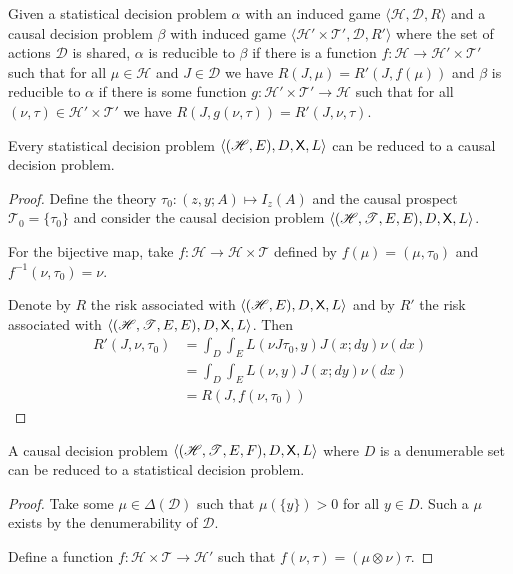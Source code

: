 \begin{definition}
Given a statistical decision problem $\alpha$ with an induced game $\langle \mathscr{H}, \mathscr{D}, R\rangle$ and a causal decision problem $\beta$ with induced game $\langle \mathscr{H}'\times \mathscr{T}', \mathscr{D}, R'\rangle$ where the set of actions $\mathscr{D}$ is shared, $\alpha$ is reducible to $\beta$ if there is a function $f:\mathscr{H}\to \mathscr{H}'\times\mathscr{T}'$ such that for all $\mu\in \mathscr{H}$ and $J\in \mathscr{D}$ we have $R(J,\mu)=R'(J,f(\mu))$ and $\beta$ is reducible to $\alpha$ if there is some function $g:\mathscr{H}'\times\mathscr{T}'\to \mathscr{H}$ such that for all $(\nu,\tau)\in \mathscr{H}'\times \mathscr{T}'$ we have $R(J,g(\nu,\tau))=R'(J,\nu,\tau)$.
\end{definition}

\begin{theorem}
Every statistical decision problem $\langle (\mathscr{H},E),D,\mathsf{X},L\rangle$ can be reduced to a causal decision problem.
\end{theorem}
\begin{proof}
Define the theory $\tau_0:(z,y;A)\mapsto I_z(A)$ and the causal prospect $\mathscr{T}_0=\{\tau_0\}$ and consider the causal decision problem $\langle (\mathscr{H},\mathscr{T},E,E),D,\mathsf{X},L\rangle$. 

For the bijective map, take $f:\mathscr{H}\to \mathscr{H}\times\mathscr{T}$ defined by $f(\mu)=(\mu,\tau_0)$ and $f^{-1}(\nu,\tau_0)=\nu$.

Denote by $R$ the risk associated with $\langle (\mathscr{H},E),D,\mathsf{X},L\rangle$ and by $R'$ the risk associated with $\langle (\mathscr{H},\mathscr{T},E,E),D,\mathsf{X},L\rangle$. Then
\begin{align}
    R'(J,\nu,\tau_0) &= \int_D\int_E L(\nu J\tau_0, y) J(x;dy) \nu(dx)\\
                   &= \int_D\int_E L(\nu,y) J(x;dy) \nu(dx)\\
                   &=R(J,f(\nu,\tau_0))
\end{align}
\end{proof}

\begin{theorem}
A causal decision problem $\langle (\mathscr{H},\mathscr{T},E,F),D,\mathsf{X},L\rangle$ where $D$ is a denumerable set can be reduced to a statistical decision problem.
\end{theorem}

\begin{proof}
Take some $\mu\in \Delta(\mathcal{D})$ such that $\mu(\{y\})>0$ for all $y\in D$. Such a $\mu$ exists by the denumerability of $\mathcal{D}$.

Define a function $f:\mathscr{H}\times\mathscr{T}\to \mathscr{H}'$ such that $f(\nu,\tau)=(\mu\otimes\nu)\tau$. 
\end{proof}
